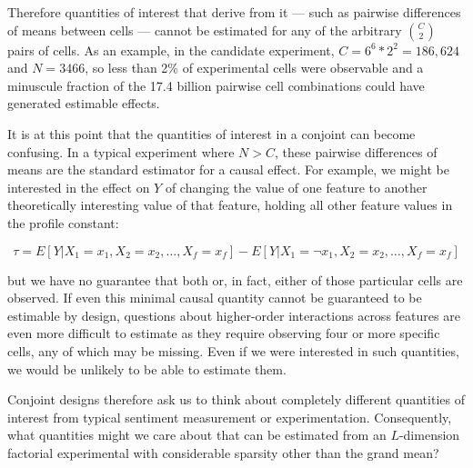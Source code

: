 \documentclass[a4paper,12pt]{article}\usepackage[]{graphicx}\usepackage[]{color}
\begin{document}
Therefore quantities of interest that derive from it --- such as pairwise differences of means between cells --- cannot be estimated for any of the arbitrary $\binom{C}{2}$ pairs of cells. As an example, in the \cite{HainmuellerHopkinsYamamoto2014} candidate experiment, $C = 6^6 * 2^2 = 186,624$ and $N = 3466$, so less than 2\% of experimental cells were observable and a minuscule fraction of the 17.4 billion pairwise cell combinations could have generated estimable effects. 

It is at this point that the quantities of interest in a conjoint can become confusing. In a typical experiment where $N > C$, these pairwise differences of means are the standard estimator for a causal effect. For example, we might be interested in the effect on $Y$ of changing the value of one feature to another theoretically interesting value of that feature, holding all other feature values in the profile constant:

\begin{equation}
\tau = E[Y|X_1=x_1,X_2=x_2,\dots,X_f=x_f] - E[Y|X_1= \neg x_1,X_2=x_2,\dots,X_f=x_f]
\end{equation}

\noindent but we have no guarantee that both or, in fact, either of those particular cells are observed. If even this minimal causal quantity cannot be guaranteed to be estimable by design, questions about higher-order interactions across features are even more difficult to estimate as they require observing four or more specific cells, any of which may be missing. Even if we were interested in such quantities, we would be unlikely to be able to estimate them.

Conjoint designs therefore ask us to think about completely different quantities of interest from typical sentiment measurement or experimentation. Consequently, what quantities might we care about that can be estimated from an $L$-dimension factorial experimental with considerable sparsity other than the grand mean? 
\end{document}
